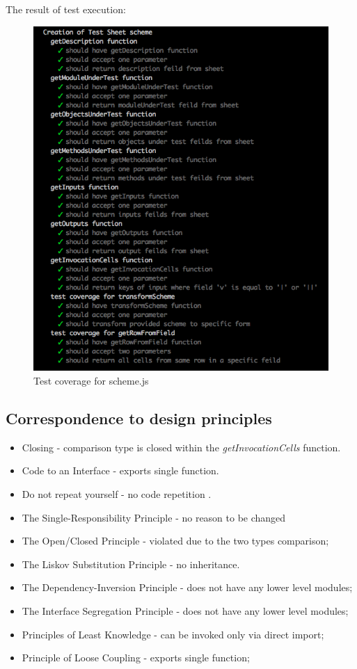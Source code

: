 The result of test execution:
\begin{figure}[H]
	\centering
	\includegraphics[width=\linewidth]{grafiken/testScheme.png}
	\caption{Test coverage for scheme.js}
	\label{fig:testScheme}
\end{figure}

\subsection{Correspondence to design principles}
\begin{itemize}
	\item Closing - comparison type is closed within the \textit{getInvocationCells} function.
	\item Code to an Interface - exports single function. 
	\item Do not repeat yourself - no code repetition .
	\item The Single-Responsibility Principle - no reason to be changed
	\item The Open/Closed Principle - violated due to the two types comparison;
	\item The Liskov Substitution Principle - no inheritance.
	\item The Dependency-Inversion Principle - does not have any lower level modules;
	\item The Interface Segregation Principle - does not have any lower level modules;
	\item Principles of Least Knowledge - can be invoked only via direct import;
	\item Principle of Loose Coupling - exports single function;
\end{itemize}


